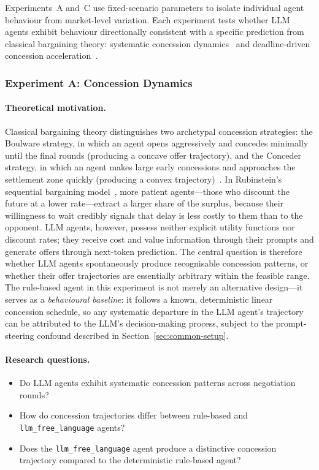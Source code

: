 Experiments~A and~C use fixed-scenario parameters to isolate individual agent behaviour from market-level variation.  Each experiment tests whether LLM agents exhibit behaviour directionally consistent with a specific prediction from classical bargaining theory: systematic concession dynamics~\cite{rubinstein1982} and deadline-driven concession acceleration~\cite{roth1988deadline}.

\subsubsection{Experiment A: Concession Dynamics}
\label{sec:exp-concession}

\paragraph{Theoretical motivation.}
Classical bargaining theory distinguishes two archetypal concession strategies: the Boulware strategy, in which an agent opens aggressively and concedes minimally until the final rounds (producing a concave offer trajectory), and the Conceder strategy, in which an agent makes large early concessions and approaches the settlement zone quickly (producing a convex trajectory)~\cite{raiffa1982}.  In Rubinstein's sequential bargaining model~\cite{rubinstein1982}, more patient agents---those who discount the future at a lower rate---extract a larger share of the surplus, because their willingness to wait credibly signals that delay is less costly to them than to the opponent.  LLM agents, however, possess neither explicit utility functions nor discount rates; they receive cost and value information through their prompts and generate offers through next-token prediction.  The central question is therefore whether LLM agents spontaneously produce recognisable concession patterns, or whether their offer trajectories are essentially arbitrary within the feasible range.  The rule-based agent in this experiment is not merely an alternative design---it serves as a \emph{behavioural baseline}: it follows a known, deterministic linear concession schedule, so any systematic departure in the LLM agent's trajectory can be attributed to the LLM's decision-making process, subject to the prompt-steering confound described in Section~\ref{sec:common-setup}.

\paragraph{Research questions.}
\begin{itemize}
    \item[\textbf{RQ-A1.}] Do LLM agents exhibit systematic concession patterns across negotiation rounds?
    \item[\textbf{RQ-A2.}] How do concession trajectories differ between rule-based and \texttt{llm\_free\_language} agents?
    \item[\textbf{RQ-A3.}] Does the \texttt{llm\_free\_language} agent produce a distinctive concession trajectory compared to the deterministic rule-based agent?
\end{itemize}


